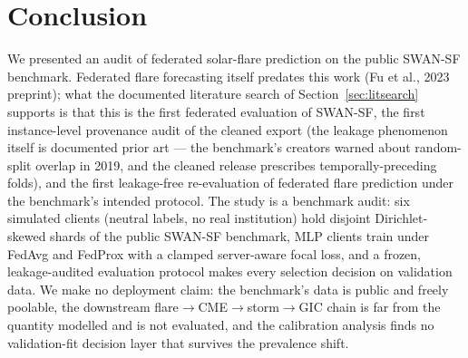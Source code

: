 \section{Conclusion}\label{sec:conclusion}

We presented an audit of federated solar-flare prediction on the
public SWAN-SF benchmark. Federated flare forecasting itself predates
this work (Fu et al., 2023 preprint); what the documented literature
search of Section~\ref{sec:litsearch} supports is that this is the
first federated evaluation of SWAN-SF, the first instance-level
provenance audit of the cleaned export (the leakage phenomenon
itself is documented prior art --- the benchmark's creators warned
about random-split overlap in 2019, and the cleaned release
prescribes temporally-preceding folds), and the first
leakage-free re-evaluation of federated flare prediction under the
benchmark's intended protocol. The study is a benchmark audit: six
simulated clients (neutral labels, no real institution) hold disjoint
Dirichlet-skewed shards of the public SWAN-SF benchmark, MLP clients
train under FedAvg and FedProx with a clamped server-aware focal loss,
and a frozen, leakage-audited evaluation protocol makes every
selection decision on validation data. We make no deployment claim:
the benchmark's data is public and freely poolable, the downstream
flare$\to$CME$\to$storm$\to$GIC chain is far from the quantity
modelled and is not evaluated, and the calibration analysis finds no
validation-fit decision layer that survives the prevalence shift.

